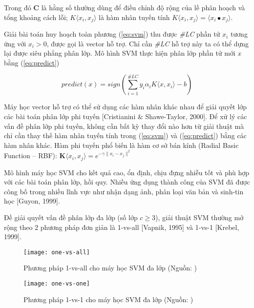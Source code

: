 Trong đó $\boldsymbol{C}$ là hằng số thường dùng để điều chỉnh độ rộng của lề phân hoạch và tổng khoảng cách lỗi; $K\langle x_i, x_j\rangle$ là hàm nhân tuyến tính $K \langle x_i, x_j \rangle = \langle x_i \bullet x_j \rangle$.\par

Giải bài toán huy hoạch toàn phương (\ref{eq:svm}) thu được \emph{\#LC} phần tử $x_i$ tương ứng với $x_i > 0$, được gọi là vector hỗ trợ. Chỉ cần \emph{\#LC} hỗ trợ này ta có thể dựng lại được siêu phẳng phân lớp. Mô hình SVM thực hiện phân lớp phần tử mới \emph{x} bằng (\ref{eq:predict})

\begin{equation}\label{eq:predict}
predict(x) = sign \left( \sum_{i=1}^{\#LC} y_i \alpha_i K\langle x, x_i \rangle - b \right)
\end{equation}

Máy học vector hỗ trợ có thể sử dụng các hàm nhân khác nhau để giải quyết lớp các bài toán phân lớp phi tuyến [Cristianini \& Shawe-Taylor, 2000]. Để xử lý các vấn đề phân lớp phi tuyến, không cần bất kỳ thay đổi nào hơn từ giải thuật mà chỉ cần thay thế hàm nhân tuyến tính trong (\ref{eq:svm}) và (\ref{eq:predict}) bằng các hàm nhân khác. Hàm phi tuyến phổ biến là hàm cơ sở bán kính (Radial Basic Function -- RBF): $\boldsymbol{K} \langle x_i, x_j \rangle = e^{-\gamma\|x_i - x_j\|^2}$ 

Mô hình máy học SVM cho kết quả cao, ổn định, chịu đựng nhiễu tốt và phù hợp với các bài toán phân lớp, hồi quy. Nhiều ứng dụng thành công của SVM đã được công bố trong nhiều lĩnh vực như nhận dạng ảnh, phân loại văn bản và sinh-tin học [Guyon, 1999].

Đề giải quyết vấn đề phân lớp đa lớp (số lớp $c \geq 3$), giải thuật SVM thường mở rộng theo 2 phương pháp đơn giản là 1-vs-all [Vapnik, 1995] và 1-vs-1 [Krebel, 1999].

\begin{figure}[h]
	\centering
	\texttt{[image: one-vs-all]}
	\caption[Phương pháp 1-vs-all cho máy học SVM đa lớp]{Phương pháp 1-vs-all cho máy học SVM đa lớp (Nguồn: \cite{khang2019})}
	\label{fig:2.11}
\end{figure}

\begin{figure}[h]
	\centering
	\texttt{[image: one-vs-one]}
	\caption[Phương pháp 1-vs-1 cho máy học SVM đa lớp]{Phương pháp 1-vs-1 cho máy học SVM đa lớp (Nguồn: \cite{khang2019})}
	\label{fig:2.12}
\end{figure}


